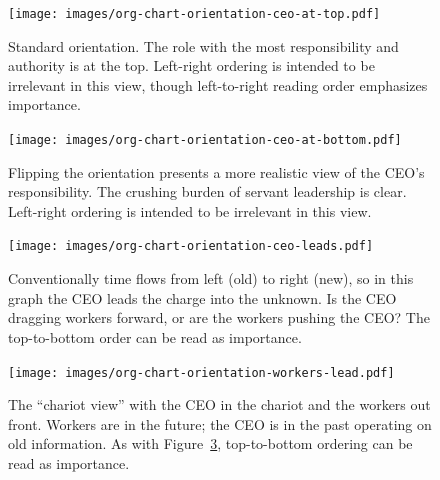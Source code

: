 \begin{figure}
\begin{center}
\texttt{[image: images/org-chart-orientation-ceo-at-top.pdf]}
\end{center}
\caption{Standard orientation. The role with the most responsibility and authority is at the top. Left-right ordering is intended to be irrelevant in this view, though left-to-right reading order emphasizes importance.}
\label{fig:org_chart_orientation_ceo-at-top}
\end{figure}

\begin{figure}
\begin{center}
\texttt{[image: images/org-chart-orientation-ceo-at-bottom.pdf]}
\end{center}
\caption{Flipping the orientation presents a more realistic view of the CEO's responsibility. The crushing burden of servant leadership is clear. Left-right ordering is intended to be irrelevant in this view.}
\label{fig:org_chart_orientation_ceo-at-bottom}
\end{figure}

\begin{figure}
\begin{center}
\texttt{[image: images/org-chart-orientation-ceo-leads.pdf]}
\end{center}
\caption{Conventionally time flows from left (old) to right (new), so in this graph the CEO leads the charge into the unknown. Is the CEO dragging workers forward, or are the workers pushing the CEO? The top-to-bottom order can be read as importance. }
\label{fig:org_chart_orientation_ceo-leads}
\end{figure}

\begin{figure}
\begin{center}
\texttt{[image: images/org-chart-orientation-workers-lead.pdf]}
\end{center}
\caption{The ``chariot view'' with the CEO in the chariot and the workers out front. Workers are in the future; the CEO is in the past operating on old information. As with Figure~\ref{fig:org_chart_orientation_ceo-leads}, top-to-bottom ordering can be read as importance. }
\label{fig:org_chart_orientation_ceo-follows}
\end{figure}

